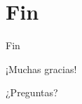 \section{Fin} 

\begin{frame}{Fin}
\begin{center}
{\Huge ¡Muchas gracias!}

{\Huge ¿Preguntas?}
\end{center}
\end{frame}
